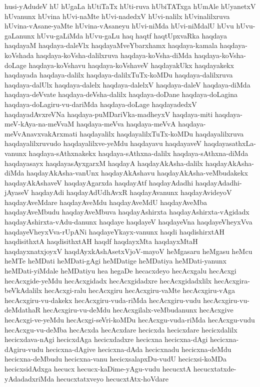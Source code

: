 {husi-yAdudeV
hU
hUgaLa
hUtiTaTx
hUti-ruva
hUbiTATxga
hUmAle
hUyanetxV
hUvanunx
hUvina
hUvi-naMte
hUvi-nadedxV
hUvi-nalilx
hUvinalilxruva
hUvina-vAsane-yaMte
hUvina-vAsaneyu
hUvi-niMda
hUvi-niMdalU
hUvu
hUvu-gaLanunx
hUvu-gaLiMda
hUvu-gaLu
haq
haqtf
haqtUpxvaRka
haqdaya
haqdayaM
haqdaya-daleVlx
haqdayaMveYbarxhamx
haqdaya-kamala
haqdaya-koVshada
haqdaya-koVsha-dalilxruva
haqdaya-koVsha-diMda
haqdaya-koVsha-doLage
haqdaya-koVshavu
haqdaya-koVshaveV
haqdayakUkx
haqdayakekx
haqdayada
haqdaya-dalilx
haqdaya-dalilxTuTx-koMDu
haqdaya-dalilxruva
haqdaya-dalUlx
haqdaya-dalelx
haqdaya-dalelxV
haqdaya-daleV
haqdaya-diMda
haqdaya-deVvate
haqdaya-deVsha-dalilx
haqdaya-doDane
haqdaya-doLagina
haqdaya-doLagiru-vu-dariMda
haqdaya-doLage
haqdayadedxV
haqdayadAvxreVNa
haqdaya-puMDariVka-madheyxV
haqdaya-miti
haqdaya-meV-kAya-na-meVvaM
haqdaya-meVva
haqdaya-meVvA
haqdaya-meVvAnavxvakArxmati
haqdayalilx
haqdayalilxTuTx-koMDu
haqdayalilxruva
haqdayalilxruvudo
haqdayalilxve-yeMdu
haqdayavu
haqdayaveV
haqdayasathxLa-vanunx
haqdaya-sAthxnakekx
haqdaya-sAthxna-dalilx
haqdaya-sAthxna-diMda
haqdayasayx
haqdayasAyxgarxM
haqdayA
haqdayAkAsha-dalilx
haqdayAkAsha-diMda
haqdayAkAsha-vanUnx
haqdayAkAshavu
haqdayAkAsha-veMbudakekx
haqdayAkAshaveV
haqdayAgarxda
haqdayAtf
haqdayAdadhi
haqdayAdadhi-jAyaseV
haqdayAdi
haqdayAdUdhAvxR
haqdayAvanunx
haqdayAvideyoV
haqdayAveMdare
haqdayAveMdu
haqdayAveMdU
haqdayAveMba
haqdayAveMbudu
haqdayAveMbuva
haqdayAshirxta
haqdayAshirxta-vAgidadx
haqdayAshirxta-vAdu-danunx
haqdaye
haqdayeV
haqdayeVna
haqdayeVheyxVva
haqdayeVheyxVva-rUpANi
haqdayeYkayx-vanunx
haqdi
haqdishirxtAH
haqdisithxtA
haqdisithxtAH
haqdf
haqdayxMta
haqdayxMtaH
haqdayxnatxjoyxV
haqdAyxkAshAsetxVjoV-mayoV
heMgasaru
heMgasu
heMcu
heMTe
heMDati
heMDati-gAgi
heMDatige
heMDatiya
heMDati-yanunx
heMDati-yiMdale
heMDatiyu
hea
hegaDe
hecacxdeyo
hecAcxgalu
hecAcxgi
hecAcxgide-yeMdu
hecAcxgidadx
hecAcxgidadxre
hecAcxgidadxlilx
hecAcxgira-beVkAdalilx
hecAcxgi-ralu
hecAcxgiru
hecAcxgiru-vaMte
hecAcxgiru-vAga
hecAcxgiru-vu-dakekx
hecAcxgiru-vuda-riMda
hecAcxgiru-vudu
hecAcxgiru-vu-deMdathaR
hecAcxgiru-vu-deMdu
hecAcxgilalx-veMbudanunx
hecAcxgive
hecAcxgi-ve-yeMdu
hecAcxgi-seVri-koMDu
hecAcxgu-vuda-riMda
hecAcxgu-vudu
hecAcxgu-vu-deMba
hecAcxda
hecAcxdare
hecicxda
hecicxdare
hecicxdalilx
hecicxdava-nAgi
hecicxdAga
hecicxdadxre
hecicxna
hecicxna-dAgi
hecicxna-dAgiru-vudu
hecicxna-dAgive
hecicxna-dAda
hecicxnadu
hecicxna-deMdu
hecicxna-deMbudu
hecicxna-vanu
hecicxsalapxDu-vudU
hecicxsi-koMDa
hecicxsidAdxga
hecucx
hecucx-kaDime-yAgu-vudu
hecucxtA
hecucxtatxde-yAdadadxriMda
hecucxtatxveyo
hecucxtAtx-hoVdare
}
